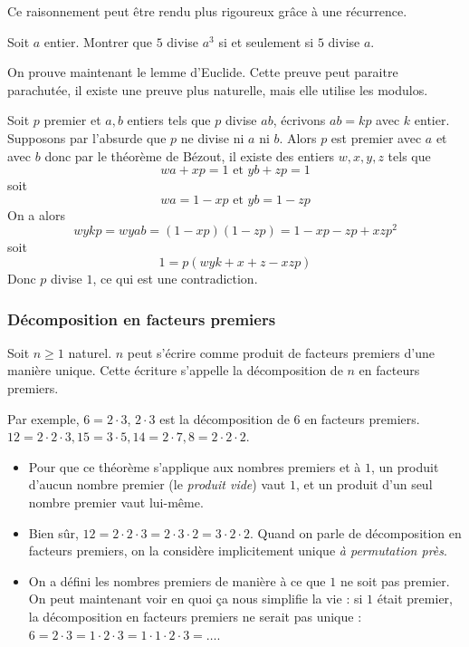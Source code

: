 \begin{rem}
Ce raisonnement peut être rendu plus rigoureux grâce à une récurrence.
\end{rem}


\begin{exo}
Soit $a$ entier.
Montrer que $5$ divise $a^3$ si et seulement si $5$ divise $a$.
\end{exo}


On prouve maintenant le lemme d'Euclide. Cette preuve peut paraitre parachutée, il existe une preuve plus naturelle, mais elle utilise les modulos.

\begin{preuve}
Soit $p$ premier et $a, b$ entiers tels que $p$ divise $ab$, écrivons $ab = kp$ avec $k$ entier. Supposons par l'absurde que $p$ ne divise ni $a$ ni $b$. Alors $p$ est premier avec $a$ et avec $b$ donc par le théorème de Bézout, il existe des entiers $w, x, y, z$ tels que
$$wa + xp = 1\text{ et }yb + zp = 1$$
soit
$$wa = 1 - xp\text{ et }yb = 1 - zp$$
On a alors
$$wykp = wyab = \left(1 - xp\right)\left(1 - zp\right) = 1 - xp - zp + xzp^2$$
soit
$$1 = p(wyk + x + z - xzp)$$
Donc $p$ divise $1$, ce qui est une contradiction.
\end{preuve}


\subsubsection{Décomposition en facteurs premiers}


\begin{thm}
Soit $n\ge 1$ naturel. $n$ peut s'écrire comme produit de facteurs premiers d'une manière unique. Cette écriture s'appelle la décomposition de $n$ en facteurs premiers.
\end{thm}

Par exemple, $6 = 2 \cdot 3$, $2 \cdot 3$ est la décomposition de $6$ en facteurs premiers. $12 = 2 \cdot 2 \cdot 3, 15 = 3 \cdot 5, 14 = 2 \cdot 7, 8 = 2 \cdot 2 \cdot 2$.

\begin{rem}
\begin{itemize}
\item Pour que ce théorème s'applique aux nombres premiers et à $1$, un produit d'aucun nombre premier (le \textit{produit vide}) vaut $1$, et un produit d'un seul nombre premier vaut lui-même.
\item Bien sûr, $12 = 2 \cdot 2 \cdot 3 = 2 \cdot 3 \cdot 2 = 3 \cdot 2 \cdot 2$. Quand on parle de décomposition en facteurs premiers, on la considère implicitement unique \textit{à permutation près}.
\item On a défini les nombres premiers de manière à ce que $1$ ne soit pas premier. On peut maintenant voir en quoi ça nous simplifie la vie : si $1$ était premier, la décomposition en facteurs premiers ne serait pas unique : $6 = 2 \cdot 3 = 1 \cdot 2 \cdot 3 = 1 \cdot 1 \cdot 2 \cdot 3 = \dots$.
\end{itemize}
\end{rem}


